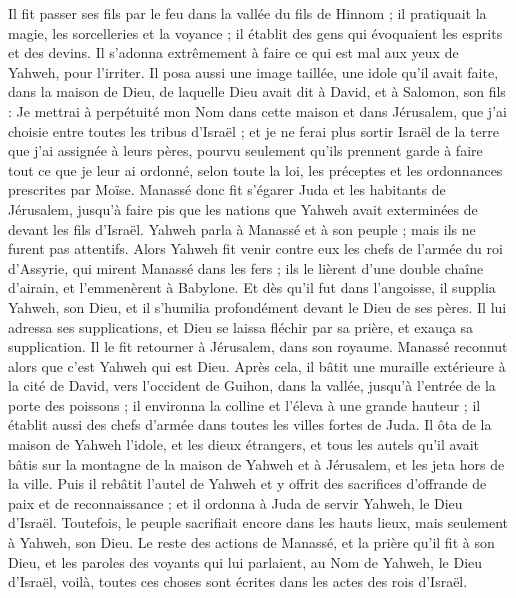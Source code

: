 \begin{multicols}{2}
Il fit passer ses fils par le feu dans la vallée du fils de Hinnom ; il pratiquait la magie, les sorcelleries et la voyance ; il établit des gens qui évoquaient les esprits et des devins. Il s'adonna extrêmement à faire ce qui est mal aux yeux de Yahweh, pour l'irriter.
Il posa aussi une image taillée, une idole qu'il avait faite, dans la maison de Dieu, de laquelle Dieu avait dit à David, et à Salomon, son fils : Je mettrai à perpétuité mon Nom dans cette maison et dans Jérusalem, que j'ai choisie entre toutes les tribus d'Israël ;
et je ne ferai plus sortir Israël de la terre que j'ai assignée à leurs pères, pourvu seulement qu'ils prennent garde à faire tout ce que je leur ai ordonné, selon toute la loi, les préceptes et les ordonnances prescrites par Moïse.
Manassé donc fit s'égarer Juda et les habitants de Jérusalem, jusqu'à faire pis que les nations que Yahweh avait exterminées de devant les fils d'Israël.
Yahweh parla à Manassé et à son peuple ; mais ils ne furent pas attentifs.
Alors Yahweh fit venir contre eux les chefs de l'armée du roi d'Assyrie, qui mirent Manassé dans les fers ; ils le lièrent d'une double chaîne d'airain, et l'emmenèrent à Babylone.
Et dès qu'il fut dans l'angoisse, il supplia Yahweh, son Dieu, et il s'humilia profondément devant le Dieu de ses pères.
Il lui adressa ses supplications, et Dieu se laissa fléchir par sa prière, et exauça sa supplication. Il le fit retourner à Jérusalem, dans son royaume. Manassé reconnut alors que c'est Yahweh qui est Dieu.
Après cela, il bâtit une muraille extérieure à la cité de David, vers l'occident de Guihon, dans la vallée, jusqu'à l'entrée de la porte des poissons ; il environna la colline et l'éleva à une grande hauteur ; il établit aussi des chefs d'armée dans toutes les villes fortes de Juda.
Il ôta de la maison de Yahweh l'idole, et les dieux étrangers, et tous les autels qu'il avait bâtis sur la montagne de la maison de Yahweh et à Jérusalem, et les jeta hors de la ville.
Puis il rebâtit l'autel de Yahweh et y offrit des sacrifices d'offrande de paix et de reconnaissance ; et il ordonna à Juda de servir Yahweh, le Dieu d'Israël.
Toutefois, le peuple sacrifiait encore dans les hauts lieux, mais seulement à Yahweh, son Dieu.
Le reste des actions de Manassé, et la prière qu'il fit à son Dieu, et les paroles des voyants qui lui parlaient, au Nom de Yahweh, le Dieu d'Israël, voilà, toutes ces choses sont écrites dans les actes des rois d'Israël.

\end{multicols}
